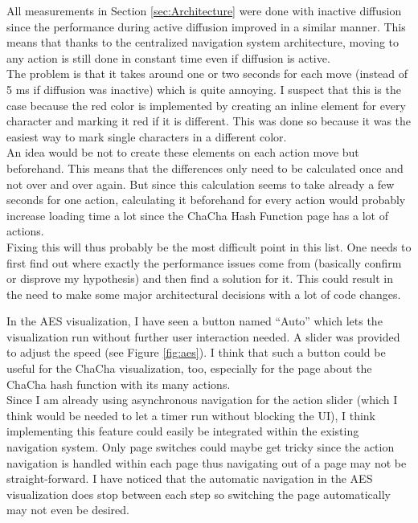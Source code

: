 \begin{description}[style=nextline]
All measurements in Section \ref{sec:Architecture} were done with inactive diffusion since the performance during active diffusion improved in a similar manner. This means that thanks to the centralized navigation system architecture, moving to any action is still done in constant time even if diffusion is active. \\
The problem is that it takes around one or two seconds for each move (instead of 5 ms if diffusion was inactive) which is quite annoying. I suspect that this is the case because the red color is implemented by creating an inline element for every character and marking it red if it is different. This was done so because it was the easiest way to mark single characters in a different color. \\
An idea would be not to create these elements on each action move but beforehand. This means that the differences only need to be calculated once and not over and over again. But since this calculation seems to take already a few seconds for one action, calculating it beforehand for every action would probably increase loading time a lot since the ChaCha Hash Function page has a lot of actions. \\
Fixing this will thus probably be the most difficult point in this list. One needs to first find out where exactly the performance issues come from (basically confirm or disprove my hypothesis) and then find a solution for it. This could result in the need to make some major architectural decisions with a lot of code changes.

\item[Automatic navigation]

In the AES visualization, I have seen a button named ``Auto'' which lets the visualization run without further user interaction needed. A slider was provided to adjust the speed (see Figure \ref{fig:aes}). I think that such a button could be useful for the ChaCha visualization, too, especially for the page about the ChaCha hash function with its many actions. \\
Since I am already using asynchronous navigation for the action slider (which I think would be needed to let a timer run without blocking the UI), I think implementing this feature could easily be integrated within the existing navigation system. Only page switches could maybe get tricky since the action navigation is handled within each page thus navigating out of a page may not be straight-forward. I have noticed that the automatic navigation in the AES visualization does stop between each step so switching the page automatically may not even be desired.


\end{description}
